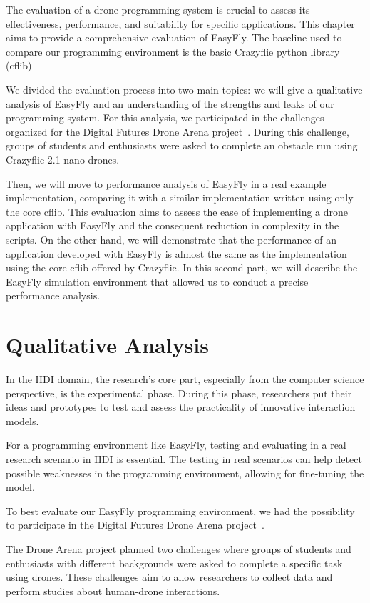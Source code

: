 The evaluation of a drone programming system is crucial to assess its effectiveness, performance, and suitability for specific applications. 
This chapter aims to provide a comprehensive evaluation of EasyFly. 
The baseline used to compare our programming environment is the basic Crazyflie python library (cflib) 

We divided the evaluation process into two main topics: we will give a qualitative analysis of EasyFly and an understanding of the strengths and leaks of our programming system.
For this analysis, we participated in the challenges organized for the Digital Futures Drone Arena project~\cite{dronearena}.
During this challenge, groups of students and enthusiasts were asked to complete an obstacle run using Crazyflie 2.1 nano drones.

Then, we will move to performance analysis of EasyFly in a real example implementation, comparing it with a similar implementation written using only the core cflib.
This evaluation aims to assess the ease of implementing a drone application with EasyFly and the consequent reduction in complexity in the scripts. 
On the other hand, we will demonstrate that the performance of an application developed with EasyFly is almost the same as the implementation using the core cflib offered by Crazyflie.
In this second part, we will describe the EasyFly simulation environment that allowed us to conduct a precise performance analysis.

\section{Qualitative Analysis}\label{sec:qualitative_analysis}
In the HDI domain, the research's core part, especially from the computer science perspective,
is the experimental phase. During this phase, researchers put their ideas and prototypes to test
and assess the practicality of innovative interaction models.

For a programming environment like EasyFly, testing and evaluating in a real research scenario in HDI is essential. 
The testing in real scenarios can help detect possible weaknesses in the programming environment, allowing for fine-tuning the model.

To best evaluate our EasyFly programming environment, we had the possibility to participate in the Digital Futures Drone Arena project~\cite{dronearena}.

The Drone Arena project planned two challenges where groups of students and enthusiasts with different backgrounds were asked to complete a specific task using drones.
These challenges aim to allow researchers to collect data and perform studies about human-drone interactions.

